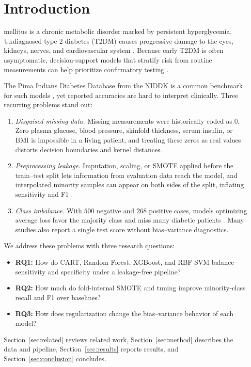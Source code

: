 \documentclass[journal]{IEEEtran}
\begin{document}
\section{Introduction}\label{sec:intro}
 mellitus is a chronic metabolic disorder marked by persistent hyperglycemia. Undiagnosed type 2 diabetes (T2DM) causes progressive damage to the eyes, kidneys, nerves, and cardiovascular system \cite{ada2024diagnosis}. Because early T2DM is often asymptomatic, decision-support models that stratify risk from routine measurements can help prioritize confirmatory testing \cite{maniruzzaman2020classification}.

The Pima Indians Diabetes Database from the NIDDK \cite{smith1988using} is a common benchmark for such models \cite{sisodia2018prediction,zou2018predicting}, yet reported accuracies are hard to interpret clinically. Three recurring problems stand out:
\begin{enumerate}
    \item \emph{Disguised missing data.} Missing measurements were historically coded as $0$. Zero plasma glucose, blood pressure, skinfold thickness, serum insulin, or BMI is impossible in a living patient, and treating these zeros as real values distorts decision boundaries and kernel distances.
    \item \emph{Preprocessing leakage.} Imputation, scaling, or SMOTE applied before the train--test split lets information from evaluation data reach the model, and interpolated minority samples can appear on both sides of the split, inflating sensitivity and F1 \cite{kaufman2012leakage,kapoor2023leakage}.
    \item \emph{Class imbalance.} With $500$ negative and $268$ positive cases, models optimizing average loss favor the majority class and miss many diabetic patients \cite{he2009learning}. Many studies also report a single test score without bias--variance diagnostics.
\end{enumerate}

We address these problems with three research questions:
\begin{itemize}
    \item \textbf{RQ1:} How do CART, Random Forest, XGBoost, and RBF-SVM balance sensitivity and specificity under a leakage-free pipeline?
    \item \textbf{RQ2:} How much do fold-internal SMOTE and tuning improve minority-class recall and F1 over baselines?
    \item \textbf{RQ3:} How does regularization change the bias--variance behavior of each model?
\end{itemize}
Section~\ref{sec:related} reviews related work, Section~\ref{sec:method} describes the data and pipeline, Section~\ref{sec:results} reports results, and Section~\ref{sec:conclusion} concludes.
\end{document}
